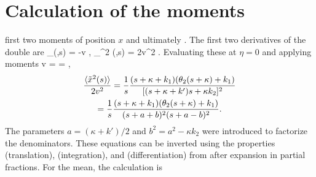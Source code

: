 \section{Calculation of the moments}
\label{sec:appendixB}

\DIFdelbegin {}\DIFdelend \DIFaddbegin {}\DIFaddend first two moments of position $x$ and ultimately \DIFdelbegin {}\DIFdelend \DIFaddbegin {}\DIFaddend . The first two derivatives of the double \DIFdelbegin {}\DIFdelend \DIFaddbegin {}\DIFaddend are
\be \partial_\eta \tp(\eta,s) = -v ,\ee
\be \partial_\eta^2 \tp(\eta,s) = 2v^2  .\ee
Evaluating these at $\eta=0$ and applying \DIFdelbegin {}\DIFdelend \DIFaddbegin {}\DIFaddend moments
\be  {} {v} =  =  \label{eq:lapmean},\ee
\DIFaddbegin \begin{multline} \frac{\langle \tilde{x}^2(s) \rangle}{2v^2} = \frac{1}{s} \frac{(s+\kappa+k_1)(\theta_2(s+\kappa)+k_1)}{[(s+\kappa+k')s+\kappa k_2]^2} \\=  \frac{1}{s}\frac{(s+\kappa+k_1)(\theta_2(s+\kappa)+k_1)}{(s+a+b)^2(s+a-b)^2}.\label{eq:lapsecondmom}\end{multline}
\DIFaddend The parameters $a= (\kappa+k')/2$ and $b^2 = a^2 -\kappa k_2$ were introduced to factorize the denominators.
These equations can be inverted using the properties \DIFaddbegin [\DIFaddend 15.164\DIFaddbegin ] \DIFaddend (translation),  \DIFaddend (integration), and \DIFaddbegin [\DIFaddend 15.123\DIFaddbegin ] \DIFaddend (differentiation) from  \citet{Arfken1985} after expansion in partial fractions.
For the mean, the calculation is
\DIFdelbegin %
